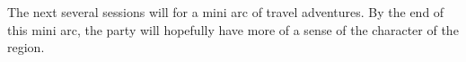 The next several sessions will for a mini arc of travel adventures.
By the end of this mini arc, the party will hopefully have more of a sense of the character of the region.
